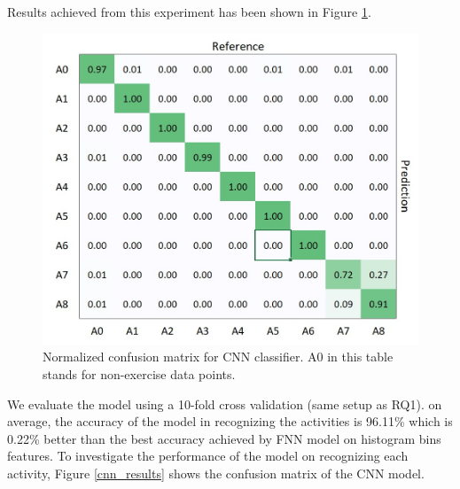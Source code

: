 \documentclass[journal,article,submit,moreauthors,pdftex]{Definitions/mdpi}
\begin{document}
Results achieved from this experiment has been shown in Figure \ref{cnn_result}.
\begin{figure}[H]
	\centering
	\includegraphics[width=7 cm]{Definitions/images/cnn_confusion.jpg}
	\caption{Normalized confusion matrix for CNN classifier. A0 in this table stands for non-exercise data points.}
	\label{cnn_result}
\end{figure} 
We evaluate the model using a 10-fold cross validation (same setup as RQ1). on average, the accuracy of the model in recognizing the activities is 96.11\% which is 0.22\% better than the best accuracy achieved by FNN model on histogram bins features. To investigate the performance of the model on  recognizing each activity, Figure \ref{cnn_results} shows the confusion matrix of the CNN model.
\end{document}

